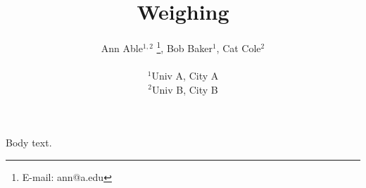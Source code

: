 \documentclass{article}
\title{Weighing}
\author{
\parbox[t]{\textwidth}
{\vspace{-1.3cm}
\begin{flushleft}
Ann Able$^{1,2}$
\thanks{E-mail: ann@a.edu},
Bob Baker$^{1}$,
Cat Cole$^{2}$
\end{flushleft}
}
\\
$^{1}$Univ A, City A\\
$^{2}$Univ B, City B
}
\begin{document}
\maketitle
Body text.
\end{document}
